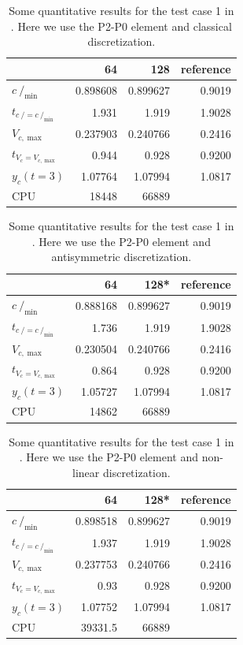 \documentclass[a4paper,12pt,onecolumn]{article}
\newcommand{\strikec}{\mbox{$c\!\!\!\!\:/$}}
\begin{document}
\begin{table}
\center
\begin{tabular}{lrrr}
\hline
& 64 & 128 & reference \\
\hline
$\strikec_{\min}$ & 0.898608 & 0.899627 & 0.9019 \\
$t_{\strikec = \strikec_{\min}}$ & 1.931 & 1.919 & 1.9028 \\
$V_{c,\max}$ & 0.237903 & 0.240766 & 0.2416 \\
$t_{V_c = V_{c,\max}}$ & 0.944 & 0.928 & 0.9200 \\
$y_c(t=3)$ & 1.07764 & 1.07994 & 1.0817 \\
CPU & 18448 & 66889 & \\
\hline
\end{tabular}
\caption{Some quantitative results for the test case 1 in
\cite{HysingTKPBGT09}. Here we use the P2-P0 element and classical
discretization.}
\label{tab:2d_benchmark1_P0_classical}
\end{table}

\begin{table}
\center
\begin{tabular}{lrrr}
\hline
& 64 & 128* & reference \\
\hline
$\strikec_{\min}$ & 0.888168 & 0.899627 & 0.9019 \\
$t_{\strikec = \strikec_{\min}}$ & 1.736 & 1.919 & 1.9028 \\
$V_{c,\max}$ & 0.230504 & 0.240766 & 0.2416 \\
$t_{V_c = V_{c,\max}}$ & 0.864 & 0.928 & 0.9200 \\
$y_c(t=3)$ & 1.05727 & 1.07994 & 1.0817 \\
CPU & 14862 & 66889 & \\
\hline
\end{tabular}
\caption{Some quantitative results for the test case 1 in
\cite{HysingTKPBGT09}. Here we use the P2-P0 element and antisymmetric
discretization.}
\label{tab:2d_benchmark1_P0_antisym}
\end{table}

\begin{table}
\center
\begin{tabular}{lrrr}
\hline
& 64 & 128* & reference \\
\hline
$\strikec_{\min}$ & 0.898518 & 0.899627 & 0.9019 \\
$t_{\strikec = \strikec_{\min}}$ & 1.937 & 1.919 & 1.9028 \\
$V_{c,\max}$ & 0.237753 & 0.240766 & 0.2416 \\
$t_{V_c = V_{c,\max}}$ & 0.93 & 0.928 & 0.9200 \\
$y_c(t=3)$ & 1.07752 & 1.07994 & 1.0817 \\
CPU & 39331.5 & 66889 & \\
\hline
\end{tabular}
\caption{Some quantitative results for the test case 1 in
\cite{HysingTKPBGT09}. Here we use the P2-P0 element and non-linear
discretization.}
\label{tab:2d_benchmark1_P0_nonlinear}
\end{table}
\end{document}
